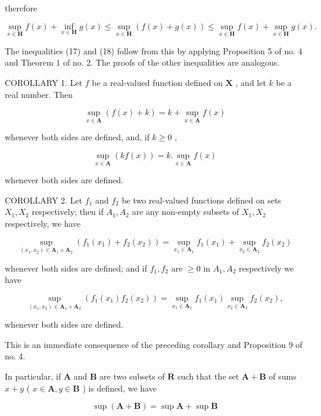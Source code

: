 therefore

\[
\sup _ {x \in \mathbf {H}} f (x) + \inf _ {x \in \mathbf {H}} g (x) \leqslant \sup _ {x \in \mathbf {H}} (f (x) + g (x)) \leqslant \sup _ {x \in \mathbf {H}} f (x) + \sup _ {x \in \mathbf {H}} g (x).
\]

The inequalities (17) and (18) follow from this by applying Proposition 5 of no. 4 and Theorem 1 of no. 2. The proofs of the other inequalities are analogous.

COROLLARY 1. Let \(f\) be a real-valued function defined on \(\mathbf{X}\) , and let \(k\) be a real number. Then

\[
\sup _ {x \in \mathbf {A}} (f (x) + k) = k + \sup _ {x \in \mathbf {A}} f (x)\tag{22}
\]

whenever both sides are defined, and, if \(k \geqslant 0\) ,

\[
\sup _ {x \in \mathbf {A}} (k f (x)) = k. \sup _ {x \in \mathbf {A}} f (x)\tag{23}
\]

whenever both sides are defined.

COROLLARY 2. Let \(f_{1}\) and \(f_{2}\) be two real-valued functions defined on sets \(X_{1}, X_{2}\) respectively; then if \(A_{1}, A_{2}\) are any non-empty subsets of \(X_{1}, X_{2}\) respectively, we have

\[
\sup _ {(x _ {1}, x _ {2}) \in \mathbf {A} _ {1} \times \mathbf {A} _ {2}} (f _ {1} (x _ {1}) + f _ {2} (x _ {2})) = \sup _ {x _ {1} \in \mathbf {A} _ {1}} f _ {1} (x _ {1}) + \sup _ {x _ {2} \in \mathbf {A} _ {2}} f _ {2} (x _ {2})\tag{24}
\]

whenever both sides are defined; and if \(f_1, f_2\) are \(\geqslant 0\) in \(A_1, A_2\) respectively we have

\[
\sup _ {(x _ {1}, x _ {2}) \in \mathbf {A} _ {1} \times \mathbf {A} _ {2}} (f _ {1} (x _ {1}) f _ {2} (x _ {2})) = \sup _ {x _ {1} \in \mathbf {A} _ {1}} f _ {1} (x _ {1}) \sup _ {x _ {2} \in \mathbf {A} _ {2}} f _ {2} (x _ {2}),\tag{25}
\]

whenever both sides are defined.

This is an immediate consequence of the preceding corollary and Proposition 9 of no. 4.

In particular, if \(\mathbf{A}\) and \(\mathbf{B}\) are two subsets of \(\overline{\mathbf{R}}\) such that the set \(\mathbf{A} + \mathbf{B}\) of sums \(x + y\) ( \(x \in \mathbf{A}, y \in \mathbf{B}\) ) is defined, we have

\[
\sup (\mathbf {A} + \mathbf {B}) = \sup \mathbf {A} + \sup \mathbf {B}\tag{26}
\]

